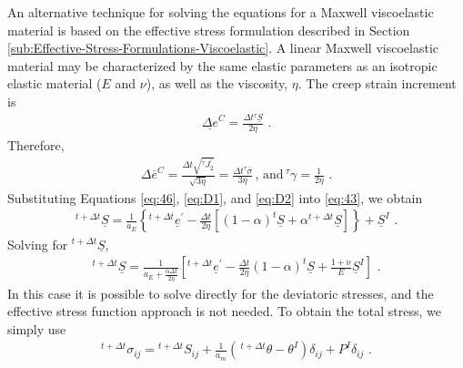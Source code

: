 An alternative technique for solving the equations for a Maxwell viscoelastic
material is based on the effective stress formulation described in
Section \ref{sub:Effective-Stress-Formulations-Viscoelastic}. A linear
Maxwell viscoelastic material may be characterized by the same elastic
parameters as an isotropic elastic material ($E$ and $\nu$), as
well as the viscosity, $\eta$. The creep strain increment is
\begin{gather}
\underline{\Delta e}^{C}=\frac{\Delta t\phantom{}^{\tau}\underline{S}}{2\eta}\,\,.\label{eq:D1}
\end{gather}
Therefore,
\begin{gather}
\Delta\overline{e}^{C}=\frac{\Delta t\sqrt{^{\tau}J_{2}^{\prime}}}{\sqrt{3\eta}}=\frac{\Delta t\phantom{}^{\tau}\overline{\sigma}}{3\eta}\,,\,\mathrm{and}\,^{\tau}\gamma=\frac{1}{2\eta}\,\,.\label{eq:D2}
\end{gather}
Substituting Equations \ref{eq:46}, \ref{eq:D1}, and \ref{eq:D2}
into \ref{eq:43}, we obtain
\begin{gather}
^{t+\Delta t}\underline{S}=\frac{1}{a_{E}}\left\{ ^{t+\Delta t}\underline{e}^{\prime}-\frac{\Delta t}{2\eta}\left[(1-\alpha)^{t}\underline{S}+\alpha\phantom{}^{t+\Delta t}\underline{S}\right]\right\} +\underline{S}^{I}\,\,.\label{eq:D3}
\end{gather}
Solving for $^{t+\Delta t}\underline{S}$,
\begin{gather}
^{t+\Delta t}\underline{S}=\frac{1}{a_{E}+\frac{\alpha\Delta t}{2\eta}}\left[^{t+\Delta t}\underline{e}^{\prime}-\frac{\Delta t}{2\eta}(1-\alpha)^{t}\underline{S}+\frac{1+\mathrm{\nu}}{E}\underline{S}^{I}\right]\,\,.\label{eq:D4}
\end{gather}
In this case it is possible to solve directly for the deviatoric stresses,
and the effective stress function approach is not needed. To obtain
the total stress, we simply use
\begin{gather}
^{t+\Delta t}\sigma_{ij}=\phantom{}^{t+\Delta t}S_{ij}+\frac{\mathit{1}}{a_{m}}\left(\,^{t+\Delta t}\theta-\theta^{I}\right)\delta_{ij}+P^{I}\delta_{ij}\,\,.\label{eq:D5}
\end{gather}


